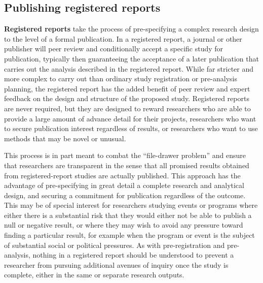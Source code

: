 
\subsection{Publishing registered reports}

\textbf{Registered reports}
take the process of pre-specifying a complex research design
to the level of a formal publication.
In a registered report, a journal or other publisher
will peer review and conditionally accept a specific study for publication,
typically then guaranteeing the acceptance of a later publication
that carries out the analysis described in the registered report.
While far stricter and more complex to carry out than
ordinary study registration or pre-analysis planning,
the registered report has the added benefit
of peer review and expert feedback
on the design and structure of the proposed study.
Registered reports are never required,
but they are designed to reward researchers
who are able to provide a large amount of advance detail for their projects,
researchers who want to secure publication interest regardless of results,
or researchers who want to use methods that may be novel or unusual.

This process is in part meant to combat the ``file-drawer problem''
and ensure that researchers are transparent in the sense that
all promised results obtained from registered-report studies are actually published.
This approach has the advantage of pre-specifying in great detail
a complete research and analytical design,
and securing a commitment for publication regardless of the outcome.
This may be of special interest for researchers
studying events or programs where either there is a substantial risk
that they would either not be able to publish a null or negative result,
or where they may wish to avoid any pressure toward finding a particular result,
for example when the program or event is the subject of substantial social or political pressures.
As with pre-registration and pre-analysis,
nothing in a registered report should be understood
to prevent a researcher from pursuing additional avenues of inquiry
once the study is complete, either in the same or separate research outputs.

